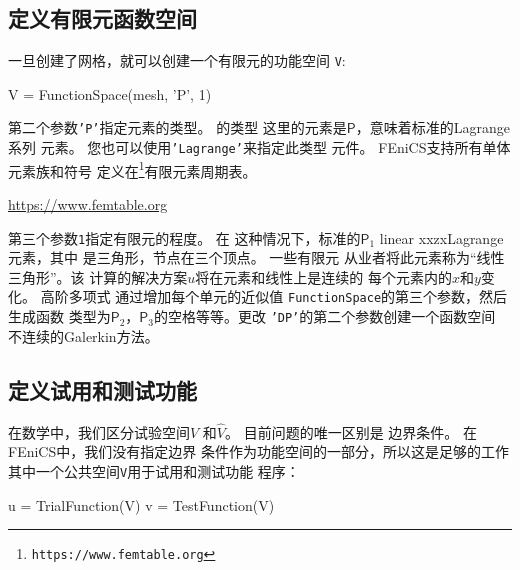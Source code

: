 
\subsection{定义有限元函数空间}

一旦创建了网格，就可以创建一个有限元的功能空间
\texttt{V}:

\begin{python}
V = FunctionSpace(mesh, 'P', 1)
\end{python}

第二个参数\texttt{'P'}指定元素的类型。 的类型
这里的元素是$\mathsf{P}$，意味着标准的Lagrange系列
元素。 您也可以使用\texttt{'Lagrange'}来指定此类型
元件。 FEniCS支持所有单体元素族和符号
定义在\footnote{\texttt{https://www.femtable.org}}{有限元素周期表}\cite{ArnoldLogg2014}。
\begin{center}
  \url{https://www.femtable.org}
\end{center}


第三个参数\texttt{1}指定有限元的程度。 在
这种情况下，标准的$\mathsf{P}_1$ linear xxzxLagrange元素，其中
是三角形，节点在三个顶点。 一些有限元
从业者将此元素称为“线性三角形”。该
计算的解决方案$u$将在元素和线性上是连续的
每个元素内的$x$和$y$变化。 高阶多项式
通过增加每个单元的近似值
\texttt{FunctionSpace}的第三个参数，然后生成函数
类型为$\mathsf{P}_2$，$\mathsf{P}_3$的空格等等。更改
\texttt{'DP'}的第二个参数创建一个函数空间
不连续的Galerkin方法。

 

\subsection{定义试用和测试功能}
在数学中，我们区分试验空间$V$
和$\hat{V}$。 目前问题的唯一区别是
边界条件。 在FEniCS中，我们没有指定边界
条件作为功能空间的一部分，所以这是足够的工作
其中一个公共空间\texttt{V}用于试用和测试功能
程序：
\begin{python}
u = TrialFunction(V)
v = TestFunction(V)
\end{python}

